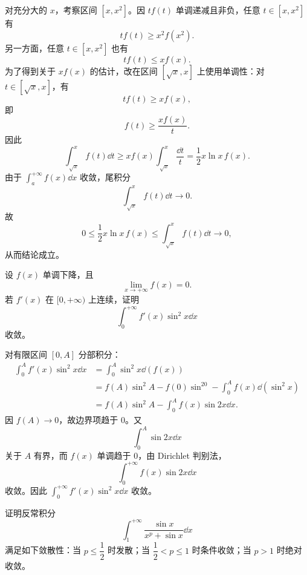\begin{solution}
	对充分大的 $x$，考察区间 $[x,x^2]$。因 $tf(t)$ 单调递减且非负，任意 $t\in[x,x^2]$ 有
	\[
	tf(t)\geq x^2 f(x^2).
	\]
	另一方面，任意 $t\in[x,x^2]$ 也有
	\[
	tf(t)\leq x f(x).
	\]
	为了得到关于 $x f(x)$ 的估计，改在区间 $[\sqrt{x},x]$ 上使用单调性：对 $t\in[\sqrt{x},x]$，有
	\[
	tf(t)\geq x f(x),
	\]
	即
	\[
	f(t)\geq \frac{x f(x)}{t}.
	\]
	因此
	\[
	\int_{\sqrt{x}}^{x}f(t)\dd t
	\geq x f(x)\int_{\sqrt{x}}^{x}\frac{\dd t}{t}
	=\frac12 x\ln x\,f(x).
	\]
	由于 $\int_a^{+\infty}f(x)\dd x$ 收敛，尾积分
	\[
	\int_{\sqrt{x}}^{x}f(t)\dd t\to0.
	\]
	故
	\[
	0\leq \frac12x\ln x\,f(x)\leq \int_{\sqrt{x}}^{x}f(t)\dd t\to0,
	\]
	从而结论成立。
\end{solution}

\begin{problem}
	设 $f(x)$ 单调下降，且
	\[
	\lim_{x\to+\infty}f(x)=0.
	\]
	若 $f'(x)$ 在 $[0,+\infty)$ 上连续，证明
	\[
	\int_0^{+\infty}f'(x)\sin^2x\dd x
	\]
	收敛。
\end{problem}

\begin{solution}
	对有限区间 $[0,A]$ 分部积分：
	\[
	\begin{aligned}
		\int_0^A f'(x)\sin^2x\dd x
		&=\int_0^A \sin^2x\dd(f(x))\\
		&=f(A)\sin^2A-f(0)\sin^20-\int_0^A f(x)\dd(\sin^2x)\\
		&=f(A)\sin^2A-\int_0^A f(x)\sin2x\dd x.
	\end{aligned}
	\]
	因 $f(A)\to0$，故边界项趋于 $0$。又
	\[
	\int_0^A\sin2x\dd x
	\]
	关于 $A$ 有界，而 $f(x)$ 单调趋于 $0$，由 Dirichlet 判别法，
	\[
	\int_0^{+\infty}f(x)\sin2x\dd x
	\]
	收敛。因此 $\int_0^{+\infty}f'(x)\sin^2x\dd x$ 收敛。
\end{solution}

\begin{problem}
	证明反常积分
	\[
	\int_1^{+\infty}\frac{\sin x}{x^p+\sin x}\dd x
	\]
	满足如下敛散性：当 $p\leq\dfrac12$ 时发散；当 $\dfrac12<p\leq1$ 时条件收敛；当 $p>1$ 时绝对收敛。
\end{problem}

